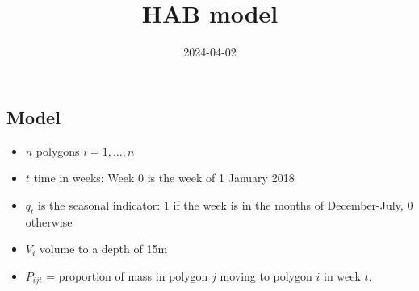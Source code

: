 \documentclass[
]{article}
\title{HAB model}
\author{}
\date{\vspace{-2.5em}2024-04-02}
\begin{document}
\maketitle

\hypertarget{model}{%
\subsection{Model}\label{model}}

\begin{itemize}
\item
  \(n\) polygons \(i=1,\ldots,n\)
\item
  \(t\) time in weeks: Week 0 is the week of 1 January 2018
\item
  \(q_t\) is the seasonal indicator: 1 if the week is in the months of
  December-July, 0 otherwise
\item
  \(V_i\) volume to a depth of 15m
\item
  \(P_{ijt}\) = proportion of mass in polygon \(j\) moving to polygon
  \(i\) in week \(t\).


\end{itemize}
\end{document}
